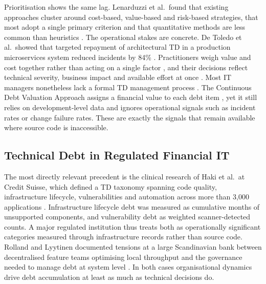 \documentclass[
  journal,
]{IEEEtran}%
\begin{document}
Prioritisation shows the same lag. Lenarduzzi et al.~found that existing
approaches cluster around cost-based, value-based and risk-based
strategies, that most adopt a single primary criterion and that
quantitative methods are less common than heuristics
. The
operational stakes are concrete. De Toledo et al.~showed that targeted
repayment of architectural TD in a production microservices system
reduced incidents by 84\%
.
Practitioners weigh value and cost together rather than acting on a
single factor
, and
their decisions reflect technical severity, business impact and
available effort at once
. Most IT
managers nonetheless lack a formal TD management process
. The Continuous
Debt Valuation Approach assigns a financial value to each debt item
, yet it
still relies on development-level data and ignores operational signals
such as incident rates or change failure rates. These are exactly the
signals that remain available where source code is inaccessible.

\subsection{Technical Debt in Regulated Financial
IT}\label{technical-debt-in-regulated-financial-it}

The most directly relevant precedent is the clinical research of Haki et
al.~at Credit Suisse, which defined a TD taxonomy spanning code quality,
infrastructure lifecycle, vulnerabilities and automation across more
than 3,000 applications
. Infrastructure
lifecycle debt was measured as cumulative months of unsupported
components, and vulnerability debt as weighted scanner-detected counts.
A major regulated institution thus treats both as operationally
significant categories measured through infrastructure records rather
than source code. Rolland and Lyytinen documented tensions at a large
Scandinavian bank between decentralised feature teams optimising local
throughput and the governance needed to manage debt at system level
. In both
cases organisational dynamics drive debt accumulation at least as much
as technical decisions do.
\end{document}
